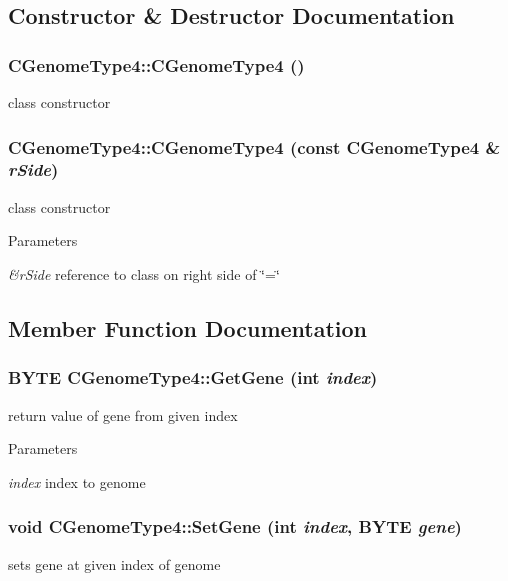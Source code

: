\subsection{Constructor \& Destructor Documentation}
\hypertarget{classCGenomeType4_a48a81653decfdcd49be75fcefb8b9631}{
\subsubsection[{CGenomeType4}]{\setlength{\rightskip}{0pt plus 5cm}CGenomeType4::CGenomeType4 ()}}
\label{classCGenomeType4_a48a81653decfdcd49be75fcefb8b9631}
class constructor \hypertarget{classCGenomeType4_ace78f82cd5544971117f518012f34901}{
\subsubsection[{CGenomeType4}]{\setlength{\rightskip}{0pt plus 5cm}CGenomeType4::CGenomeType4 (const {\bf CGenomeType4} \& {\em rSide})}}
\label{classCGenomeType4_ace78f82cd5544971117f518012f34901}
class constructor


\begin{DoxyParams}{Parameters}
\item[{\em \&rSide}]reference to class on right side of \char`\"{}=\char`\"{} \end{DoxyParams}


\subsection{Member Function Documentation}
\hypertarget{classCGenomeType4_a8d55be3eefbd0e6451d385b231c8c96a}{
\subsubsection[{GetGene}]{\setlength{\rightskip}{0pt plus 5cm}BYTE CGenomeType4::GetGene (int {\em index})}}
\label{classCGenomeType4_a8d55be3eefbd0e6451d385b231c8c96a}
return value of gene from given index


\begin{DoxyParams}{Parameters}
\item[{\em index}]index to genome \end{DoxyParams}
\hypertarget{classCGenomeType4_a1add0c5bed39e85a32e3a00ea2809032}{
\subsubsection[{SetGene}]{\setlength{\rightskip}{0pt plus 5cm}void CGenomeType4::SetGene (int {\em index}, \/  BYTE {\em gene})}}
\label{classCGenomeType4_a1add0c5bed39e85a32e3a00ea2809032}
sets gene at given index of genome


